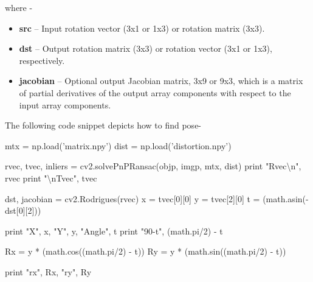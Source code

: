 \documentclass[]{article}
\newenvironment{Shaded}{}{}
\newcommand{\DecValTok}[1]{\textcolor[rgb]{0.25,0.63,0.44}{{#1}}}
\newcommand{\CharTok}[1]{\textcolor[rgb]{0.25,0.44,0.63}{{#1}}}
\newcommand{\StringTok}[1]{\textcolor[rgb]{0.25,0.44,0.63}{{#1}}}
\newcommand{\OperatorTok}[1]{\textcolor[rgb]{0.40,0.40,0.40}{{#1}}}
\newcommand{\BuiltInTok}[1]{{#1}}
\newcommand{\NormalTok}[1]{{#1}}
\begin{document}
where -

\begin{itemize}
\item
  \textbf{src} -- Input rotation vector (3x1 or 1x3) or rotation matrix
  (3x3).
\item
  \textbf{dst} -- Output rotation matrix (3x3) or rotation vector (3x1
  or 1x3), respectively.
\item
  \textbf{jacobian} -- Optional output Jacobian matrix, 3x9 or 9x3,
  which is a matrix of partial derivatives of the output array
  components with respect to the input array components.
\end{itemize}

The following code snippet depicts how to find pose-

\begin{Shaded}
\begin{Highlighting}[]
\NormalTok{mtx }\OperatorTok{=} \NormalTok{np.load(}\StringTok{'matrix.npy'}\NormalTok{)}
\NormalTok{dist }\OperatorTok{=} \NormalTok{np.load(}\StringTok{'distortion.npy'}\NormalTok{)}

\NormalTok{rvec, tvec, inliers }\OperatorTok{=} \NormalTok{cv2.solvePnPRansac(objp, imgp, mtx, dist)}
\BuiltInTok{print} \StringTok{"Rvec}\CharTok{\textbackslash{}n}\StringTok{"}\NormalTok{, rvec}
\BuiltInTok{print} \StringTok{"}\CharTok{\textbackslash{}n}\StringTok{Tvec"}\NormalTok{, tvec}


\NormalTok{dst, jacobian }\OperatorTok{=} \NormalTok{cv2.Rodrigues(rvec)}
\NormalTok{x }\OperatorTok{=} \NormalTok{tvec[}\DecValTok{0}\NormalTok{][}\DecValTok{0}\NormalTok{]}
\NormalTok{y }\OperatorTok{=} \NormalTok{tvec[}\DecValTok{2}\NormalTok{][}\DecValTok{0}\NormalTok{]}
\NormalTok{t }\OperatorTok{=} \NormalTok{(math.asin(}\OperatorTok{-}\NormalTok{dst[}\DecValTok{0}\NormalTok{][}\DecValTok{2}\NormalTok{]))}

\BuiltInTok{print} \StringTok{"X"}\NormalTok{, x, }\StringTok{"Y"}\NormalTok{, y, }\StringTok{"Angle"}\NormalTok{, t}
\BuiltInTok{print} \StringTok{"90-t"}\NormalTok{, (math.pi}\OperatorTok{/}\DecValTok{2}\NormalTok{) }\OperatorTok{-} \NormalTok{t}

\NormalTok{Rx }\OperatorTok{=} \NormalTok{y }\OperatorTok{*} \NormalTok{(math.cos((math.pi}\OperatorTok{/}\DecValTok{2}\NormalTok{) }\OperatorTok{-} \NormalTok{t))}
\NormalTok{Ry }\OperatorTok{=} \NormalTok{y }\OperatorTok{*} \NormalTok{(math.sin((math.pi}\OperatorTok{/}\DecValTok{2}\NormalTok{) }\OperatorTok{-} \NormalTok{t))}

\BuiltInTok{print} \StringTok{"rx"}\NormalTok{, Rx, }\StringTok{"ry"}\NormalTok{, Ry}
\end{Highlighting}
\end{Shaded}
\end{document}
